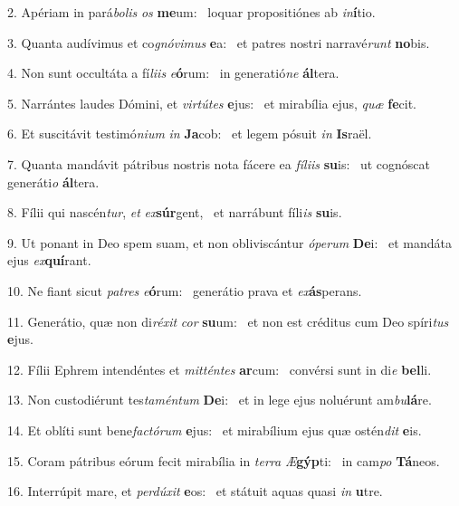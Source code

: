 2. Apériam in pará\textit{bo}\textit{lis} \textit{os} \textbf{me}um: \ast\  loquar propositiónes ab \textit{in}\textbf{í}tio.\

3. Quanta audívimus et co\textit{gnó}\textit{vi}\textit{mus} \textbf{e}a: \ast\  et patres nostri narravé\textit{runt} \textbf{no}bis.\

4. Non sunt occultáta a fí\textit{li}\textit{is} \textit{e}\textbf{ó}rum: \ast\  in generatió\textit{ne} \textbf{ál}tera.\

5. Narrántes laudes Dómini, et \textit{vir}\textit{tú}\textit{tes} \textbf{e}jus: \ast\  et mirabília ejus, \textit{quæ} \textbf{fe}cit.\

6. Et suscitávit testimó\textit{ni}\textit{um} \textit{in} \textbf{Ja}cob: \ast\  et legem pósuit \textit{in} \textbf{Is}raël.\

7. Quanta mandávit pátribus nostris nota fácere ea \textit{fí}\textit{li}\textit{is} \textbf{su}is: \ast\  ut cognóscat generáti\textit{o} \textbf{ál}tera.\

8. Fílii qui nascén\textit{tur}, \textit{et} \textit{ex}\textbf{súr}gent, \ast\  et narrábunt fíli\textit{is} \textbf{su}is.\

9. Ut ponant in Deo spem suam, et non obliviscántur \textit{ó}\textit{pe}\textit{rum} \textbf{De}i: \ast\  et mandáta ejus \textit{ex}\textbf{quí}rant.\

10. Ne fiant sicut \textit{pa}\textit{tres} \textit{e}\textbf{ó}rum: \ast\  generátio prava et \textit{ex}\textbf{ás}perans.\

11. Generátio, quæ non di\textit{ré}\textit{xit} \textit{cor} \textbf{su}um: \ast\  et non est créditus cum Deo spíri\textit{tus} \textbf{e}jus.\

12. Fílii Ephrem intendéntes et \textit{mit}\textit{tén}\textit{tes} \textbf{ar}cum: \ast\  convérsi sunt in di\textit{e} \textbf{bel}li.\

13. Non custodiérunt tes\textit{ta}\textit{mén}\textit{tum} \textbf{De}i: \ast\  et in lege ejus noluérunt am\textit{bu}\textbf{lá}re.\

14. Et oblíti sunt bene\textit{fac}\textit{tó}\textit{rum} \textbf{e}jus: \ast\  et mirabílium ejus quæ ostén\textit{dit} \textbf{e}is.\

15. Coram pátribus eórum fecit mirabília in \textit{ter}\textit{ra} \textit{Æ}\textbf{gýp}ti: \ast\  in cam\textit{po} \textbf{Tá}neos.\

16. Interrúpit mare, et \textit{per}\textit{dú}\textit{xit} \textbf{e}os: \ast\  et státuit aquas quasi \textit{in} \textbf{u}tre.\

